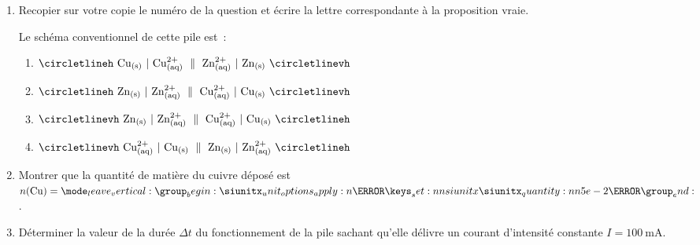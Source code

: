 \begin{enumerate}
    \item Recopier sur votre copie le numéro de la question et écrire la lettre
          correspondante à la proposition vraie.

          Le schéma conventionnel de cette pile est~:
          \begin{enumerate}[label={\textbf{\Alph*)}}]
              \item $\circletlineh~\ce{Cu_{(s)}}~|~\ce{Cu^2+_{(aq)}}~\parallel~
                    \ce{Zn^2+_{(aq)}}~|~\ce{Zn_{(s)}}~\circletlinevh$
              \item $\circletlineh~\ce{Zn_{(s)}}~|~\ce{Zn^2+_{(aq)}}~\parallel~
                    \ce{Cu^2+_{(aq)}}~|~\ce{Cu_{(s)}}~\circletlinevh$
              \item $\circletlinevh~\ce{Zn_{(s)}}~|~\ce{Zn^2+_{(aq)}}~\parallel~
                    \ce{Cu^2+_{(aq)}}~|~\ce{Cu_{(s)}}~\circletlineh$
              \item $\circletlinevh~\ce{Cu^2+_{(aq)}}~|~\ce{Cu_{(s)}}~\parallel~
                    \ce{Zn_{(s)}}~|~\ce{Zn^2+_{(aq)}}~\circletlineh$
          \end{enumerate}
    \item Montrer que la quantité de matière du cuivre déposé est
          $n(\ce{Cu})=\qty{5e-2}{\mole}$.
    \item Déterminer la valeur de la durée $\Delta t$ du fonctionnement de la
          pile sachant qu'elle délivre un courant d'intensité constante
          $I=\qty{100}{\mA}$.
\end{enumerate}

